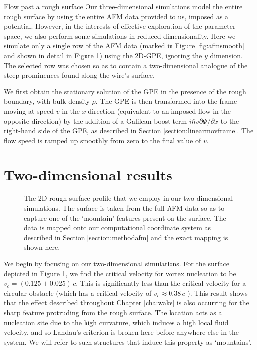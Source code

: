 \begin{chapter}{\label{cha:afm}Flow past a rough surface}
Our three-dimensional simulations model the entire rough surface by using the entire AFM data provided to us, imposed as a potential. However, in the interests of effective exploration of the parameter space, we also perform some simulations in reduced dimensionality. Here we simulate only a single row of the AFM data (marked in Figure \ref{fig:afmsmooth} and shown in detail in Figure \ref{fig:surfprofile}) using the 2D-GPE, ignoring the $y$ dimension. The selected row was chosen so as to contain a two-dimensional analogue of the steep prominences found along the wire's surface.

We first obtain the stationary solution of the GPE in the presence of
the rough boundary, with bulk density $\rho$.  The GPE is then transformed into the frame moving at speed $v$ in the $x$-direction (equivalent to an imposed flow in the opposite direction) by the addition of a Galilean boost term $ i \hbar v \partial \Psi/\partial x$ to the right-hand side of the GPE, as described in Section \ref{section:linearmovframe}.  The flow speed is ramped up smoothly from zero to the final value of $v$.

\section{Two-dimensional results}
\begin{figure}
  \centering
  \caption{\label{fig:surfprofile} The 2D rough surface profile that we employ in our two-dimensional simulations. The surface is taken from the full AFM data so as to capture one of the `mountain' features present on the surface. The data is mapped onto our computational coordinate system as described in Section \ref{section:methodafm} and the exact mapping is shown here.}
\end{figure}

We begin by focusing on our two-dimensional simulations. For the surface depicted in Figure \ref{fig:surfprofile}, we find the critical velocity for vortex nucleation to be $v_c=(0.125\pm0.025)\,c$. This is significantly less than the critical velocity for a circular obstacle (which has a critical velocity of $v_c\approx 0.38\,c$ \cite{frisch92,nore93,win00,huepe00}). This result shows that the effect described throughout Chapter \ref{cha:wake} is also occurring for the sharp feature protruding from the rough surface. The location acts as a nucleation site due to the high curvature, which induces a high local fluid velocity, and so Landau's criterion is broken here before anywhere else in the system. We will refer to such structures that induce this property as `mountains'.


\end{chapter}

